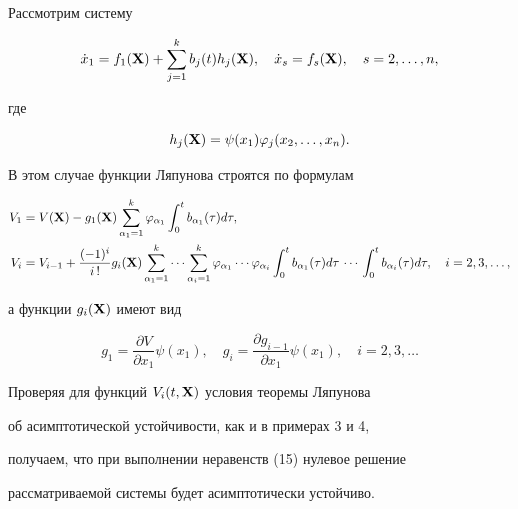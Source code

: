 \begin{exam} Рассмотрим систему 


$$


\Dot x_1=f_1(\bx)+\sum^k_{j=1}b_j(t)h_j(\bx),\quad


\Dot x_s=f_s(\bx),\quad s=2,\dotsc,n, 


$$


где 


$$ 


h_j(\bx)=\psi(x_1)\varphi_j(x_2,\dotsc,x_n). 


$$ 


В этом случае функции Ляпунова строятся по формулам 


\begin{align*} 


V_1&=V(\bx)-g_1(\bx)\sum^k_{\alpha_1=1}\varphi_{\alpha_1} 


\int^t_0 b_{\alpha_1}(\tau)d\tau,\\ 


%


V_i&=V_{i-1}+\frac{(-1)^i}{i\,!}g_i(\bx) 


\sum^k_{\alpha_1=1}\dotsb\sum^k_{\alpha_i=1} 


\varphi_{\alpha_1}\dotsb\varphi_{\alpha_i}


\int^t_0 b_{\alpha_1}(\tau)d\tau\,\dotsb\,\int^t_0 


b_{\alpha_i}(\tau)d\tau,\quad i=2,3,\dotsc, 


\end{align*} 


а функции $g_i(\bold X)$ имеют вид 


$$


g_1=\frac{\partial V}{\partial x_1}\psi(x_1),\quad


g_i=\frac{\partial g_{i-1}}{\partial x_1}\psi(x_1),\quad 


i=2,3,\dotsc 


$$


 


Проверяя для функций $V_i(t,\bold X)$ условия теоремы Ляпунова 


об асимптотической устойчивости, как и в примерах 3 и 4, 


получаем, что при выполнении неравенств (15) нулевое решение 


рассматриваемой системы будет асимптотически устойчиво. 


\end{exam} 


